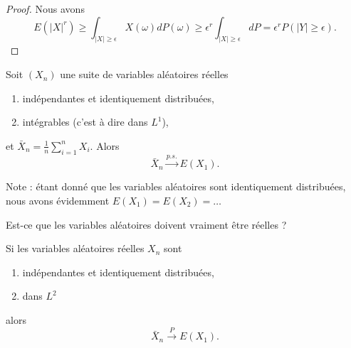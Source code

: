 \begin{proof}
    Nous avons
    \begin{equation}
        E(| X |^r)\geq\int_{| X |\geq \epsilon}X(\omega)dP(\omega)\geq \epsilon^r\int_{| X |\geq\epsilon}dP=\epsilon^rP(| Y |\geq\epsilon).
    \end{equation}
\end{proof}

\begin{theorem}
    Soit \( (X_n)\) une suite de variables aléatoires réelles
    \begin{enumerate}
        \item
            indépendantes et identiquement distribuées,
        \item
            intégrables (c'est à dire dans \( L^1\)),
    \end{enumerate}
    et \( \bar X_n=\frac{1}{ n }\sum_{i=1}^nX_i\). Alors
    \begin{equation}
        \bar X_n\stackrel{p.s.}{\longrightarrow} E(X_1).
    \end{equation}
\end{theorem}
Note : étant donné que les variables aléatoires sont identiquement distribuées, nous avons évidemment \( E(X_1)=E(X_2)=\ldots\)

\begin{probleme}
    Est-ce que les variables aléatoires doivent vraiment être réelles ?
\end{probleme}

\begin{corollary}
    Si les variables aléatoires réelles \( X_n\) sont
    \begin{enumerate}
        \item
            indépendantes et identiquement distribuées,
        \item
            dans \( L^2\)
    \end{enumerate}
    alors
    \begin{equation}
        \bar X_n\stackrel{P}{\longrightarrow}E(X_1).
    \end{equation}
\end{corollary}

